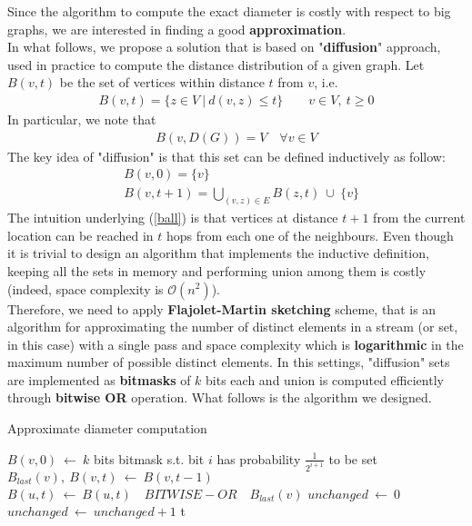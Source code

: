 Since the algorithm to compute the exact diameter is costly with respect to big graphs, we are interested in finding a good \textbf{approximation}.\\
In what follows, we propose a solution that is based on "\textbf{diffusion}" approach, used in practice to compute the distance distribution of a given graph. Let $B(v,t)$ be the set of vertices within distance $t$ from $v$, i.e.
\begin{align*}
B(v,t) = \{ z \in V \ | \ d(v,z) \le t \} \qquad v \in V, \ t \ge 0
\end{align*}
In particular, we note that
\begin{align}
B(v,D(G)) = V \quad \forall v \in V \label{ball_diameter}
\end{align}
The key idea of "diffusion" is that this set can be defined inductively as follow:
\begin{align}
&B(v,0) = \{ v \} \nonumber\\
&B(v,t+1) = \bigcup_{(v,z) \in E} B(z,t) \ \cup \ \{ v \} \label{ball}
\end{align}
The intuition underlying (\ref{ball}) is that vertices at distance $t+1$ from the current location can be reached in $t$ hops from each one of the neighbours. Even though it is trivial to design an algorithm that implements the inductive definition, keeping all the sets in memory and performing union among them is costly (indeed, space complexity is $\mathcal{O}(n^2)$).\\
Therefore, we need to apply \textbf{Flajolet-Martin sketching}\cite{fm} scheme, that is an algorithm for approximating the number of distinct elements in a stream (or set, in this case) with a single pass and space complexity which is \textbf{logarithmic} in the maximum number of possible distinct elements. In this settings, "diffusion" sets are implemented as \textbf{bitmasks} of $k$ bits each and union is computed efficiently through \textbf{bitwise OR} operation. What follows is the algorithm we designed.
\medskip
\begin{algorithm}
\caption{Approximate diameter computation}
\begin{algorithmic}[1]
		\State $B(v,0) \ \leftarrow \ k$ bits bitmask s.t. bit $i$ has probability $\frac{1}{2^{i+1}}$ to be set
	\EndFor
			\State $B_{last}(v), \ B(v,t) \ \leftarrow \ B(v,t-1)$
		\EndFor
			\State $B(u,t) \ \leftarrow \ B(u,t) \quad BITWISE-OR \quad B_{last}(v)$
		\EndFor
		\State $unchanged \ \leftarrow \ 0$
				\State $unchanged \ \leftarrow \ unchanged + 1$
			\EndIf
		\EndFor
			\State \Return t 
		\EndIf
	\EndFor
\end{algorithmic}
\end{algorithm}

